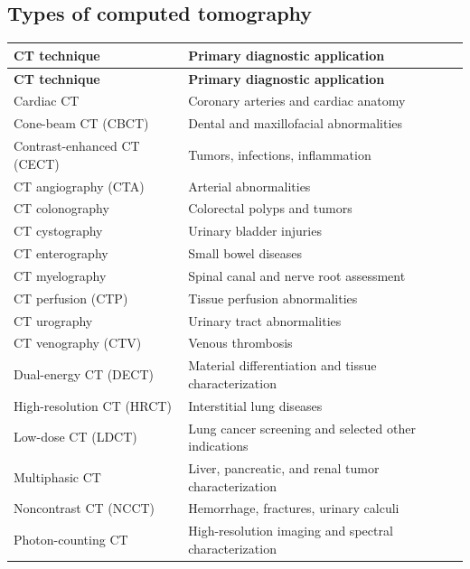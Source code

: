 \subsection{Types of computed tomography}
\begin{longtable}{@{}p{}p{}@{}}
\toprule
\textbf{CT technique} & \textbf{Primary diagnostic application} \\
\midrule
\endfirsthead
\toprule
\textbf{CT technique} & \textbf{Primary diagnostic application} \\
\midrule
\endhead
Cardiac CT & Coronary arteries and cardiac anatomy \\
Cone-beam CT (CBCT) & Dental and maxillofacial abnormalities \\
Contrast-enhanced CT (CECT) & Tumors, infections, inflammation \\
CT angiography (CTA) & Arterial abnormalities \\
CT colonography & Colorectal polyps and tumors \\
CT cystography & Urinary bladder injuries \\
CT enterography & Small bowel diseases \\
CT myelography & Spinal canal and nerve root assessment \\
CT perfusion (CTP) & Tissue perfusion abnormalities \\
CT urography & Urinary tract abnormalities \\
CT venography (CTV) & Venous thrombosis \\
Dual-energy CT (DECT) & Material differentiation and tissue characterization \\
High-resolution CT (HRCT) & Interstitial lung diseases \\
Low-dose CT (LDCT) & Lung cancer screening and selected other indications \\
Multiphasic CT & Liver, pancreatic, and renal tumor characterization \\
Noncontrast CT (NCCT) & Hemorrhage, fractures, urinary calculi \\
Photon-counting CT & High-resolution imaging and spectral characterization \\
\bottomrule
\end{longtable}

